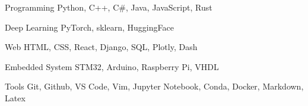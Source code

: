 

\begin{cvskills}

  \cvskill
    {Programming} %
    {Python, C++, C\#, Java, JavaScript, Rust} %

  \cvskill
    {Deep Learning} %
    {PyTorch, sklearn, HuggingFace} %

  \cvskill
    {Web} %
    {HTML, CSS, React, Django, SQL, Plotly, Dash} %

  \cvskill
    {Embedded System} %
    {STM32, Arduino, Raspberry Pi, VHDL} %

  \cvskill
    {Tools} %
    {Git, Github, VS Code, Vim, Jupyter Notebook, Conda, Docker, Markdown, Latex} %

\end{cvskills}
